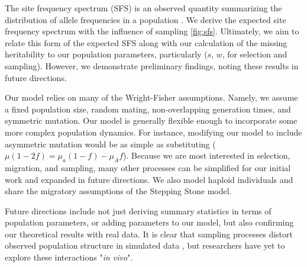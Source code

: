 The site frequency spectrum (SFS) is an observed quantity summarizing the distribution of allele frequencies in a population \cite{lapierre_accuracy_2017}. We derive the expected site frequency spectrum with the influence of sampling \ref{fig:sfs}. Ultimately, we aim to relate this form of the expected SFS along with our calculation of the missing heritability to our population parameters, particularly ($s$, $w$, for selection and sampling). However, we demonstrate preliminary findings, noting these results in future directions. 


Our model relies on many of the Wright-Fisher assumptions. Namely, we assume a fixed population size, random mating, non-overlapping generation times, and symmetric mutation. Our model is generally flexible enough to incorporate some more complex population dynamics. For instance, modifying our model to include asymmetric mutation would be as simple as substituting ($\mu(1-2f) = \mu_{a}(1-f) - \mu_{A}f$). Because we are most interested in selection, migration, and sampling, many other processes can be simplified for our initial work and expanded in future directions. We also model haploid individuals and share the migratory assumptions of the Stepping Stone model. 


Future directions include not just deriving summary statistics in terms of population parameters, or adding parameters to our model, but also confirming our theoretical results with real data. It is clear that sampling processes distort observed population structure in simulated data \cite{mcvean_genealogical_2009} \cite{battey_space_2019}, but researchers have yet to explore these interactions "\textit{in vivo}".  



